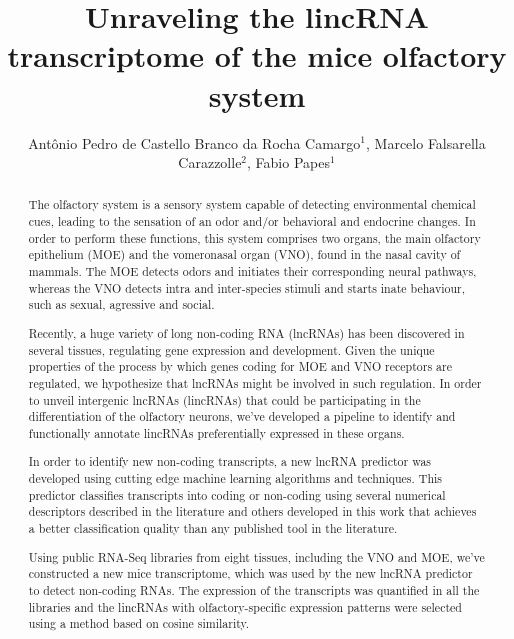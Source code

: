 \documentclass[twoside]{article}
\title{\vspace{-15mm}\fontsize{24pt}{10pt}\selectfont\textbf{Unraveling the lincRNA transcriptome of the mice olfactory system}} %
\author{Ant\^onio Pedro de Castello Branco da Rocha Camargo$^1$, Marcelo Falsarella Carazzolle$^2$, Fabio Papes$^1$}
\affil{1 UNICAMP\\ 2 BIOLOGY INSTITUTE - UNICAMP, NATIONAL CENTER FOR HIGH PERFORMANCE COMPUTING\\ }
\date{}
\begin{document}
\maketitle %

\thispagestyle{fancy} %


\begin{abstract}
The olfactory system is a sensory system capable of detecting environmental chemical cues, leading to the sensation of an odor and/or behavioral and endocrine changes. In order to perform these functions, this system comprises two organs, the main olfactory epithelium (MOE) and the vomeronasal organ (VNO), found in the nasal cavity of mammals. The MOE detects odors and initiates their corresponding neural pathways, whereas the VNO detects intra and inter-species stimuli and starts inate behaviour, such as sexual, agressive and social.

Recently, a huge variety of long non-coding RNA (lncRNAs) has been discovered in several tissues, regulating gene expression and development. Given the unique properties of the process by which genes coding for MOE and VNO receptors are regulated, we hypothesize that lncRNAs might be involved in such regulation. In order to unveil intergenic lncRNAs (lincRNAs) that could be participating in the differentiation of the olfactory neurons, we've developed a pipeline to identify and functionally annotate lincRNAs preferentially expressed in these organs.

In order to identify new non-coding transcripts, a new lncRNA predictor was developed using cutting edge machine learning algorithms and techniques. This predictor classifies transcripts into coding or non-coding using several numerical descriptors described in the literature and others developed in this work that achieves a better classification quality than any published tool in the literature.

Using public RNA-Seq libraries from eight tissues, including the VNO and MOE, we've constructed a new mice transcriptome, which was used by the new lncRNA predictor to detect non-coding RNAs. The expression of the transcripts was quantified in all the libraries and the lincRNAs with olfactory-specific expression patterns were selected using a method based on cosine similarity.


\end{abstract}
\end{document}

